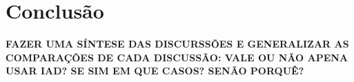 \documentclass[
	article,			    %
	12pt,				    %
	oneside,			    %
	a4paper,			    %
	chapter=TITLE,		    %
	section=TITLE,		    %
	subsection=TITLE,	    %
	english,			    %
	brazil,				    %
	sumario=tradicional
]{abntex2}
\begin{document}
\section{Conclusão}
\textbf{FAZER UMA SÍNTESE DAS DISCURSSÕES E GENERALIZAR AS COMPARAÇÕES DE CADA DISCUSSÃO: VALE OU NÃO APENA USAR IAD? SE SIM EM QUE CASOS? SENÃO PORQUÊ?}
\postextual

\begin{apendicesenv}
\end{apendicesenv}
\begin{anexosenv}
\vspace{\onelineskip}
\end{anexosenv}
\end{document}
